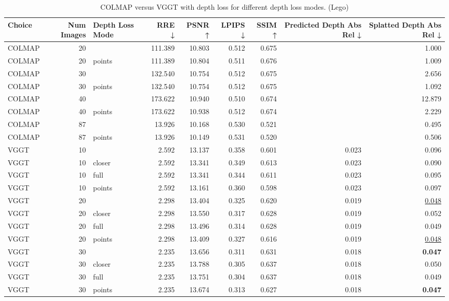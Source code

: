 \begin{table}[H]
\caption{COLMAP versus VGGT with depth loss for different depth loss modes. (Lego)}
\label{tab:05_depth_loss_num_images_lego}
\begin{tabular}{lrlrrrrrr}
\toprule
Choice & Num Images & Depth Loss Mode & RRE ↓ & PSNR ↑ & LPIPS ↓ & SSIM ↑ & Predicted Depth Abs Rel ↓ & Splatted Depth Abs Rel ↓ \\
\midrule
COLMAP & 20 &  & 111.389 & 10.803 & 0.512 & 0.675 &  & 1.000 \\
COLMAP & 20 & points & 111.389 & 10.804 & 0.511 & 0.676 &  & 1.009 \\
COLMAP & 30 &  & 132.540 & 10.754 & 0.512 & 0.675 &  & 2.656 \\
COLMAP & 30 & points & 132.540 & 10.754 & 0.512 & 0.675 &  & 1.092 \\
COLMAP & 40 &  & 173.622 & 10.940 & 0.510 & 0.674 &  & 12.879 \\
COLMAP & 40 & points & 173.622 & 10.938 & 0.512 & 0.674 &  & 2.229 \\
COLMAP & 87 &  & 13.926 & 10.168 & 0.530 & 0.521 &  & 0.495 \\
COLMAP & 87 & points & 13.926 & 10.149 & 0.531 & 0.520 &  & 0.506 \\
VGGT & 10 &  & 2.592 & 13.137 & 0.358 & 0.601 & 0.023 & 0.096 \\
VGGT & 10 & closer & 2.592 & 13.341 & 0.349 & 0.613 & 0.023 & 0.090 \\
VGGT & 10 & full & 2.592 & 13.341 & 0.344 & 0.611 & 0.023 & 0.095 \\
VGGT & 10 & points & 2.592 & 13.161 & 0.360 & 0.598 & 0.023 & 0.097 \\
VGGT & 20 &  & 2.298 & 13.404 & 0.325 & 0.620 & 0.019 & \underline{0.048} \\
VGGT & 20 & closer & 2.298 & 13.550 & 0.317 & 0.628 & 0.019 & 0.052 \\
VGGT & 20 & full & 2.298 & 13.496 & 0.314 & 0.628 & 0.019 & 0.049 \\
VGGT & 20 & points & 2.298 & 13.409 & 0.327 & 0.616 & 0.019 & \underline{0.048} \\
VGGT & 30 &  & 2.235 & 13.656 & 0.311 & 0.631 & 0.018 & \textbf{0.047} \\
VGGT & 30 & closer & 2.235 & 13.788 & 0.305 & 0.637 & 0.018 & 0.050 \\
VGGT & 30 & full & 2.235 & 13.751 & 0.304 & 0.637 & 0.018 & 0.049 \\
VGGT & 30 & points & 2.235 & 13.674 & 0.313 & 0.627 & 0.018 & \textbf{0.047} \\

\end{tabular}
\end{table}
